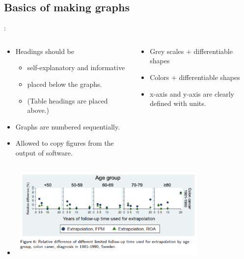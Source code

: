\subsection{Basics of making graphs}
\begin{frame}{\secname: \subsecname}
\begin{columns}[t]
\begin{column}{0.6\textwidth}	
	
\begin{itemize}
\item<1|handout:1-> Headings should be 
	\begin{itemize}
	\item self-explanatory and informative
	\item placed below the graphs.
	\item (Table headings  are placed above.)
	\end{itemize}
\item<2|handout:2-> Graphs are numbered sequentially.
\item <3|handout:3-> Allowed to copy figures from the output of software.
	\end{itemize}
	
\end{column}

\begin{column}{0.4\textwidth}	
\begin{itemize}

\item <4|handout:4-> Grey scales + differentiable shapes
\item <4|handout:4-> Colors + differentiable shapes
\item <5|handout:5-> x-axis and y-axis are clearly defined with units. 
\end{itemize}
\end{column}
\end{columns}

\begin{itemize}
\item[]<6|handout:6>	
\begin{center}
\includegraphics[width=10cm, height=4.5cm]{images/myexample}
\end{center}
\end{itemize}
\end{frame}

